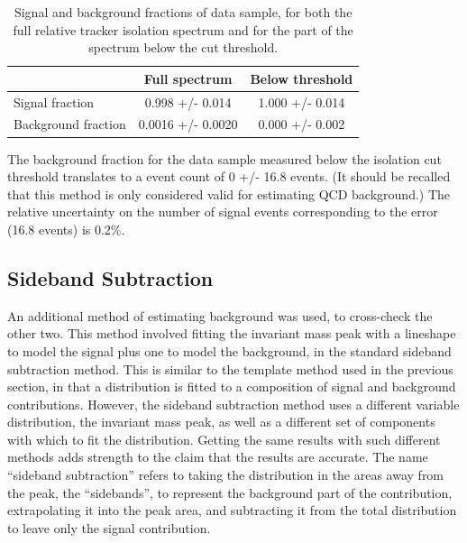 \begin{table}[htbp]
  \begin{center}
    \caption[\fixspacing Signal and background fractions of data sample]{
      \fixspacing Signal and background fractions of data sample, 
      for both the full relative tracker isolation 
      spectrum and for the part of the spectrum 
      below the cut threshold.  
    }
    \label{TableSignalBGFractions}
    \begin{tabular}[]{ | l | c | c | }
      \hline
      & Full spectrum & Below threshold  \\ \hline \hline
      Signal fraction & 0.998 +/- 0.014 & 1.000 +/- 0.014 \\ \hline 
      Background fraction & 0.0016 +/- 0.0020 & 0.000 +/- 0.002 \\ \hline
    \end{tabular}
  \end{center}
\end{table}

The background fraction for the data sample measured 
below the isolation cut threshold 
translates to a event count of 0 +/- 16.8 events.  
(It should be recalled that this method is only 
considered valid for estimating QCD background.)  
The relative uncertainty on the number of signal 
events corresponding to the error (16.8 events) 
is 0.2\%.  %


\subsection{Sideband Subtraction}
\label{anMeth:BGSubSideband}

An additional method of estimating background was 
used, %
to cross-check the other two.  
This method involved fitting the invariant mass 
peak with a lineshape to model the signal plus 
one to model the background, 
in the standard sideband subtraction method.  
This is similar to the template method used in 
the previous section, 
in that a distribution is fitted to a composition 
of signal and background contributions.  
However, the sideband subtraction method 
uses a different variable distribution, 
the invariant mass peak, 
as well as a different set of components 
with which to fit the distribution.  
Getting the same results with such 
different methods adds strength to 
the claim that the results are accurate.  
The name ``sideband subtraction'' refers 
to taking the distribution in 
the areas away from the peak, the ``sidebands'', 
to represent the background part of the contribution, 
extrapolating it into the peak area, and 
subtracting it from the total distribution 
to leave only the signal contribution.  

